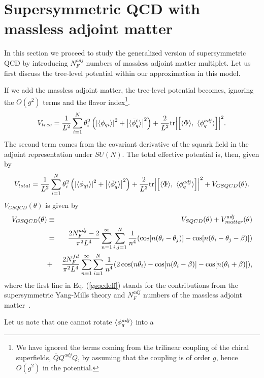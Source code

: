 \documentclass[a4paper,12pt]{article}
\begin{document}
\section{Supersymmetric QCD with massless adjoint matter}
In this section we proceed to study the generalized version of 
supersymmetric QCD by introducing $N_F^{adj}$ numbers of  
massless adjoint matter multiplet.
Let us first discuss the tree-level potential 
within our approximation in this model. 
\par
If we add the massless adjoint matter, the 
tree-level potential becomes, ignoring the $O(g^2)$ terms 
and the flavor index\footnote{We have ignored the terms coming from 
the trilinear coupling of the chiral superfields, ${\bar Q}Q^{adj}Q$, by
assuming that the coupling is of order $g$, hence $O(g^2)$ in the
potential.}.  
\begin{equation}
V_{tree}=
{1\over L^2}
\sum_{i=1}^{N}\theta_i^2\left({\left|{\langle \phi_{qi} \rangle}\right|}^2
+{\left|{\langle {\bar\phi}_q^{i} \rangle}\right|}^2\right)
+{{2}\over L^2}{\rm tr}{\left|{\Bigl[\langle \Phi \rangle,~\langle \phi_q^{adj} \rangle\Bigr]}\right|}^2.
\end{equation}
The second term comes from the covariant derivative of the
squark field in the adjoint representation under $SU(N)$. 
The total effective potential is, then, given by 
\begin{equation}
V_{total}={1\over L^2}
\sum_{i=1}^{N}\theta_i^2\left({\left|{\langle \phi_{qi} \rangle}\right|}^2
+{\left|{\langle {\bar\phi}_q^{i} \rangle}\right|}^2\right)
+{{2}\over L^2}{\rm tr}{\left|{\Bigl[\langle \Phi \rangle,~\langle \phi_q^{adj} \rangle\Bigr]}\right|}^2
+V_{GSQCD}(\theta).
\label{totalneweff}
\end{equation}
$V_{GSQCD}(\theta)$ is given by
\begin{eqnarray}
V_{GSQCD}(\theta)&\equiv &V_{SQCD}(\theta)+V_{matter}^{adj}(\theta)
\nonumber\\
&=&{{2N_F^{adj}-2}\over {\pi^2L^4}}
\sum_{n=1}^{\infty}\sum_{i,j=1}^{N}{1\over n^4}(\cos[n(\theta_i-\theta_j)]
-\cos[n(\theta_i-\theta_j-\beta)])\nonumber\\
&+&{{2N_F^{fd}}\over{\pi^2L^4}}\sum_{n=1}^{\infty}
\sum_{i=1}^{N}{1\over n^4}(2\cos(n\theta_i)-\cos[n(\theta_i-\beta)]
-\cos[n(\theta_i+\beta)]),
\label{gsqcdeff}
\end{eqnarray}
where the first line in Eq. (\ref{gsqcdeff}) stands 
for the contributions from the supersymmetric 
Yang-Mills theory and $N_F^{adj}$ numbers of the 
massless adjoint matter~\cite{takenagab}.
\par
Let us note that one cannot rotate $\langle \phi_q^{adj} \rangle$ into a 
\end{document}
